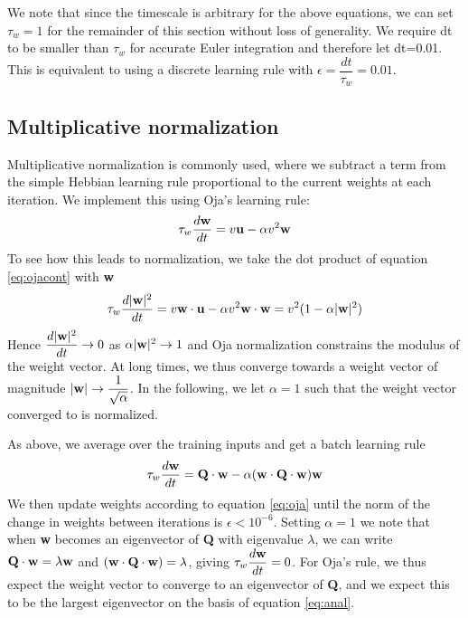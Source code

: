 \documentclass{article}
\begin{document}
We note that since the timescale is arbitrary for the above equations, we can set $\tau_w = 1$ for the remainder of this section without loss of generality. We require dt to be smaller than $\tau_w$ for accurate Euler integration and therefore let dt=0.01. This is equivalent to using a discrete learning rule with $\epsilon = \dfrac{dt}{\tau_w}=0.01$.

\subsection{Multiplicative normalization}

Multiplicative normalization is commonly used, where we subtract a term from the simple Hebbian learning rule proportional to the current weights at each iteration. We implement this using Oja's learning rule:
\begin{equation}\label{eq:ojacont}
\tau_w \dfrac{d\bf{w}}{dt} = v {\bf{u}} - \alpha v^2 {\bf{w}}
\end{equation}
To see how this leads to normalization, we take the dot product of equation \ref{eq:ojacont} with \textbf{w}
\begin{equation}
\tau_w \dfrac{d|{\bf{w}}|^2}{dt} = v {\bf{w} \cdot \bf{u}} - \alpha v^2 {\bf{w} \cdot \bf{w}} = v^2(1-\alpha |{\bf{w}}|^2)
\end{equation}
Hence $\dfrac{d|{\bf{w}}|^2}{dt} \rightarrow 0$ as $\alpha |{\bf{w}}|^2 \rightarrow 1$ and Oja normalization constrains the modulus of the weight vector. At long times, we thus converge towards a weight vector of magnitude $|{\bf{w}}| \rightarrow \dfrac{1}{\sqrt{\alpha}}$. In the following, we let $\alpha=1$ such that the weight vector converged to is normalized.

As above, we average over the training inputs and get a batch learning rule
\begin{equation}\label{eq:oja}
\tau_w \dfrac{d\bf{w}}{dt} = {\bf Q \cdot w} - \alpha ({\bf w \cdot Q \cdot w}) {\bf w}
\end{equation}
We then update weights according to equation \ref{eq:oja} until the norm of the change in weights between iterations is $\epsilon < 10^{-6}$. Setting $\alpha=1$ we note that when \textbf{w} becomes an eigenvector of \textbf{Q} with eigenvalue $\lambda$, we can write ${\bf Q \cdot w} = \lambda \bf w$ and $({\bf w \cdot Q \cdot w}) = \lambda$, giving  $\tau_w \dfrac{d\bf{w}}{dt} =0$. For Oja's rule, we thus expect the weight vector to converge to an eigenvector of \textbf{Q}, and we expect this to be the largest eigenvector on the basis of equation \ref{eq:anal}.
\end{document}
